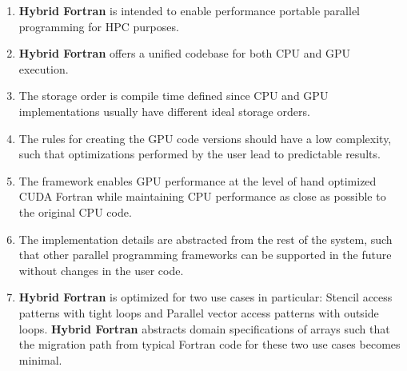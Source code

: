 \begin{enumerate}
 \item \textbf{Hybrid Fortran} is intended to enable performance portable parallel programming for HPC purposes.
 \item \label{h90goals:unifiedCodebase} \textbf{Hybrid Fortran} offers a unified codebase for both CPU and GPU execution.

 \item \label{h90goals:compileTimeDefinedStorageOrder} The storage order is compile time defined since CPU and GPU implementations usually have different ideal storage orders.
 \item \label{h90goals:lowComplexity} The rules for creating the GPU code versions should have a low complexity, such that optimizations performed by the user lead to predictable results.
 \item \label{h90goals:performance} The framework enables GPU performance at the level of hand optimized CUDA Fortran while maintaining CPU performance as close as possible to the original CPU code.
 \item \label{h90goals:flexibleImplementation} The implementation details are abstracted from the rest of the system, such that other parallel programming frameworks can be supported in the future without changes in the user code.
 \item \textbf{Hybrid Fortran} is optimized for two use cases in particular: Stencil access patterns with tight loops and Parallel vector access patterns with outside loops. \textbf{Hybrid Fortran} abstracts domain specifications of arrays such that the migration path from typical Fortran code for these two use cases becomes minimal.
\end{enumerate}

\clearpage
